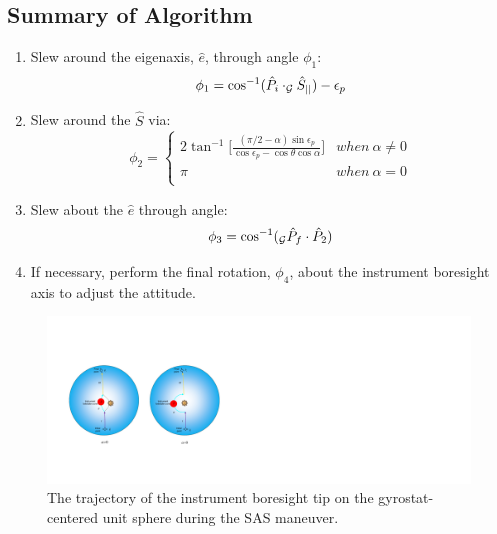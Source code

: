 \documentclass[letterpaper, paper,12pt]{AAS}		%
\begin{document}
	\subsection{Summary of Algorithm} 	
	\begin{enumerate}
		\item Slew around the eigenaxis, $\hat{e}$, through angle $\phi_1$:		
		\begin{equation}\label{phi1}
		\phi_1 = \cos^{-1}(\hat{P}_i\cdot_\mathcal{G}\hat{S}_{||})-\epsilon_p\\
		\end{equation}
		\item Slew around the $\hat{S}$ via:
		\begin{equation}\label{phi2}
		\phi_2=\left\{
		\begin{array}{ll}
		2\tan^{-1}\Big[ \frac{(\pi/2-\alpha)\sin\epsilon_p}{\cos\epsilon_p-\cos\theta\cos\alpha}\Big]& when\  \alpha\neq 0\\
		\pi& when\ \alpha=0\\
		\end{array}
		\right.
		\end{equation}
		\item Slew about the $\hat{e}$ through angle:
		\begin{equation}\label{phi3}
		\phi_3 = \cos^{-1}(_\mathcal{G}\hat{P}_f\cdot\hat{P}_2)\\
		\end{equation}		
		\item If necessary, perform the final rotation, $\phi_4$, about the instrument boresight axis to adjust the attitude. 
	\end{enumerate}
	
	
	\begin{figure}[!h]
		\begin{center}
		\includegraphics[width=6in]{./Figures/SASSchematic3}
		\caption{The trajectory of the instrument boresight tip on the gyrostat-centered unit sphere during the SAS maneuver.}
		\end{center}
	\end{figure}
	
\end{document}
